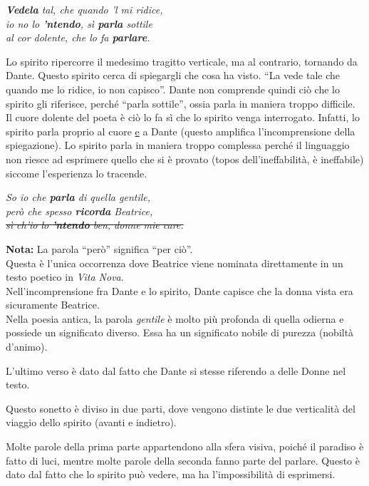 \documentclass[a4paper]{article}
\newcommand{\quotes}[1]{``#1''}
\newcommand\hr{\par\vspace{-.5\ht\strutbox}\noindent\hrulefill\par\vspace{0.15cm}}
\begin{document}
\begin{center}
    \textit{\textbf{Vedela} tal, che quando 'l mi ridice,} \\
    \textit{io no lo \textbf{'ntendo}, sì \textbf{parla} sottile} \\
    \textit{al cor dolente, che lo fa \textbf{parlare}.}
\end{center}

Lo spirito ripercorre il medesimo tragitto verticale, ma al contrario, tornando da Dante.
Questo spirito cerca di spiegargli che cosa ha visto.
\quotes{La vede tale che quando me lo ridice, io non capisco}.
Dante non comprende quindi ciò che lo spirito gli riferisce, perché
\quotes{parla sottile}, ossia parla in maniera troppo difficile.
Il cuore dolente del poeta è ciò lo fa sì che lo spirito venga interrogato.
Infatti, lo spirito parla proprio al cuore \underline{e} a Dante (questo amplifica l'incomprensione della spiegazione).
Lo spirito parla in maniera troppo complessa perché il linguaggio non riesce
ad esprimere quello che si è provato (topos dell'ineffabilità, è ineffabile)
siccome l'esperienza lo tracende.

\begin{center}
    \textit{So io che \textbf{parla} di quella gentile,} \\
    \textit{però che spesso \textbf{ricorda} Beatrice,} \\
    \textit{\st{sì ch'io lo \textbf{'ntendo} ben, donne mie care.}}
\end{center}

\textbf{\color{red}Nota:} La parola \quotes{però} significa \quotes{per ciò}. \\
Questa è l'unica occorrenza dove Beatrice viene nominata direttamente in un testo poetico in \textit{Vita Nova}.\\
Nell'incomprensione fra Dante e lo spirito, Dante capisce che la donna vista era sicuramente
Beatrice. \\
Nella poesia antica, la parola \textit{gentile} è molto più profonda di quella odierna
e possiede un significato diverso. Essa ha un significato nobile di purezza (nobiltà d'animo).

L'ultimo verso è dato dal fatto che Dante si stesse riferendo a delle Donne nel testo.

\hr

Questo sonetto è diviso in due parti, dove vengono distinte le due verticalità del viaggio dello spirito
(avanti e indietro).

Molte parole della prima parte appartendono alla sfera visiva, poiché il paradiso
è fatto di luci, mentre molte parole della seconda fanno parte del parlare.
Questo è dato dal fatto che lo spirito può vedere, ma ha l'impossibilità di esprimersi.
\end{document}
